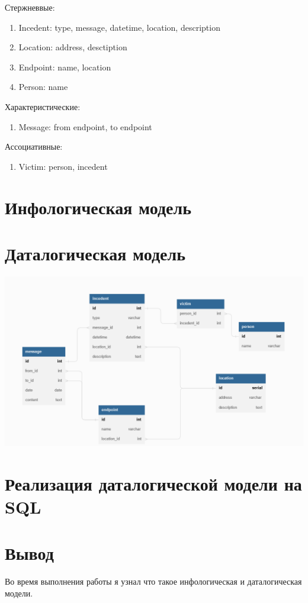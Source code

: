 \documentclass{article}
\begin{document}
Стержневвые:
\begin{enumerate}
  \item Incedent: type, message, datetime, location, description
  \item Location: address, desctiption
  \item Endpoint: name, location
  \item Person: name
\end{enumerate}
Характеристические:
\begin{enumerate}
  \item Message: from endpoint, to endpoint
\end{enumerate}
Ассоциативные:
\begin{enumerate}
  \item Victim: person, incedent
\end{enumerate}
\section{Инфологическая модель}

\section{Даталогическая модель}
\includegraphics[width=\textwidth]{dbdiagram.png}

\section{Реализация даталогической модели на SQL}

\lstset{language=SQL}

\section{Вывод}
Во время выполнения работы я узнал что такое инфологическая и даталогическая модели.
\end{document}
